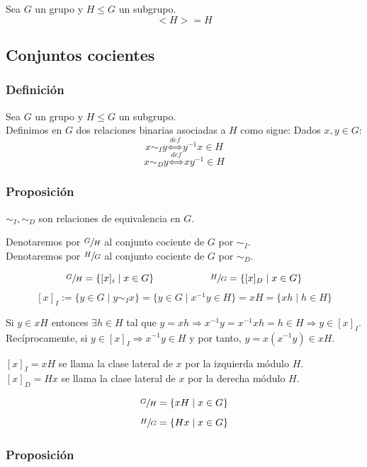 \documentclass[11pt,a4paper]{article}
\begin{document}
Sea $G$ un grupo y $H \leqslant G$ un subgrupo.
$$<H> = H$$

\subsection{Conjuntos cocientes}

\subsubsection*{Definición}

Sea $G$ un grupo y $H \leqslant G$ un subgrupo. \\
Definimos en $G$ dos relaciones binarias asociadas a $H$ como sigue: Dados $x, y \in G$:
$$x \sim_{I} y \overset{def}{\iff} y^{-1}x \in H$$
$$x \sim_{D} y \overset{def}{\iff} xy^{-1} \in H$$

\subsubsection*{Proposición}

$\sim_{I}, \sim_{D}$ son relaciones de equivalencia en $G$.

Denotaremos por $\sfrac{G}{H}$ al conjunto cociente de $G$ por $\sim_{I}$. \\
Denotaremos por $\sfrac{H}{G}$ al conjunto cociente de $G$ por $\sim_{D}$.

$$\sfrac{G}{H} = \{[x]_{i} \mid x \in G\} \hspace{2cm} \sfrac{H}{G} = \{[x]_{D} \mid x \in G \}$$
$$[x]_{I} := \{y \in G \mid y \sim_{I} x \} = \{y \in G \mid x^{-1}y \in H\} = xH = \{xh \mid h \in H\}$$

Si $y \in xH$ entonces $\exists h \in H$ tal que $y = xh \Rightarrow x^{-1}y = x^{-1}xh = h \in H \Rightarrow y \in [x]_{I}$. \\
Recíprocamente, si $y \in [x]_{I} \Rightarrow x^{-1}y \in H$ y por tanto, $y = x(x^{-1}y) \in xH$.

$[x]_{I} = xH$ se llama la clase lateral de $x$ por la izquierda módulo $H$. \\
$[x]_{D} = Hx$ se llama la clase lateral de $x$ por la derecha módulo $H$.

$$\sfrac{G}{H} = \{xH \mid x \in G\}$$
$$\sfrac{H}{G} = \{Hx \mid x \in G\}$$

\subsubsection*{Proposición}
\end{document}
